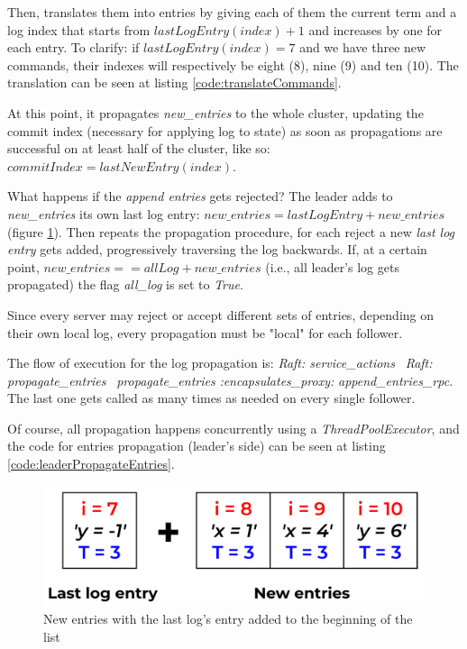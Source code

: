 Then, translates them into entries by giving each of them the current term and a log index that starts from $lastLogEntry(index) + 1$ and increases by one for each entry. To clarify: if $lastLogEntry(index) = 7$ and we have three new commands, their indexes will respectively be eight (8), nine (9) and ten (10). The translation can be seen at listing \ref{code:translateCommands}.

At this point, it propagates \textit{new\_entries} to the whole cluster, updating the commit index (necessary for applying log to state) as soon as propagations are successful on at least half of the cluster, like so: $commitIndex = lastNewEntry(index)$. 

What happens if the \textit{append entries} gets rejected? The leader adds to \textit{new\_entries} its own last log entry: $new\_entries = lastLogEntry + new\_entries$ (figure \ref{fig:newEntries}). Then repeats the propagation procedure, for each reject a new \textit{last log entry} gets added, progressively traversing the log backwards. If, at a certain point, $new\_entries == allLog + new\_entries$ (i.e., all leader's log gets propagated) the flag \textit{all\_log} is set to \textit{True}. 

Since every server may reject or accept different sets of entries, depending on their own local log, every propagation must be "local" for each follower. 

The flow of execution for the log propagation is: \textit{Raft: service\_actions} \faArrowRight\ \textit{Raft: propagate\_entries} \faArrowRight\ \textit{propagate\_entries} \textit{:encapsulates\_proxy:} \textit{append\_entries\_rpc}. The last one gets called as many times as needed on every single follower.

Of course, all propagation happens concurrently using a \textit{ThreadPoolExecutor}, and the code for entries propagation (leader's side) can be seen at listing \ref{code:leaderPropagateEntries}.

\begin{figure}[h]
  \centering
  \includegraphics[width=.8\linewidth]{images/newEntries.png}
  
  \caption{New entries with the last log's entry added to the beginning of the list}
  \label{fig:newEntries}
\end{figure}

